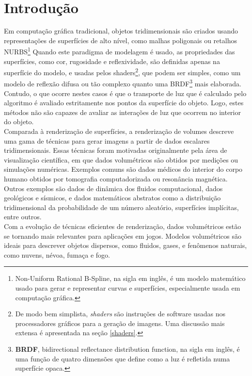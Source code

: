 \documentclass[12pt, a4paper, oneside]{book}
\begin{document}
%
%
%
\chapter{Introdução}	

Em computação gráfica tradicional, objetos tridimensionais são criados usando representações de superfícies de alto nível, como malhas poligonais ou retalhos NURBS\footnote{Non-Uniform Rational B-Spline, na sigla em inglês, é um modelo matemático usado para gerar e representar curvas e superfícies, especialmente usada em computação gráfica.} Quando este paradigma de modelagem é usado, as propriedades das superfícies, como cor, rugosidade e reflexividade, são definidas apenas na superfície do modelo, e usadas pelos shaders\footnote{De modo bem simplista, {\it shaders} são instruções de software usadas nos processadores gráficos para a geração de imagens. Uma discussão mais extensa é apresentada na seção \ref{shaders}.}, que podem ser simples, como um modelo de reflexão difusa ou tão complexo quanto uma BRDF\footnote{{\bf BRDF}, bidirectional reflectance distribution function, na sigla em inglês, é uma função de quatro dimensões que define como a luz é refletida numa superfície opaca.} mais elaborada. Contudo, o que ocorre nestes casos é que o transporte de luz que é calculado pelo algoritmo é avaliado estritamente nos pontos da superfície do objeto. Logo, estes métodos não são capazes de avaliar as interações de luz que ocorrem no interior do objeto. \\

Comparada à renderização de superfícies, a renderização de volumes descreve uma gama de técnicas para gerar imagens a partir de dados escalares tridimensionais. Essas técnicas foram motivadas originalmente pela área de visualização científica, em que dados volumétricos são obtidos por medições ou simulações numéricas. Exemplos comuns são dados médicos do interior do corpo humano obtidos por tomografia computadorizada ou resonância magnética. Outros exemplos são dados de dinâmica dos fluidos computacional, dados geológicos e sísmicos, e dados matemáticos abstratos como a distribuição tridimensional da probabilidade de um número aleatório, superfícies implícitas, entre outros. \\

Com a evolução de técnicas eficientes de renderização, dados volumétricos estão se tornando mais relevantes para aplicações em jogos. Modelos volumétricos são ideais para descrever objetos dispersos, como fluidos, gases, e fenômenos naturais, como nuvens, névoa, fumaça e fogo. \\
\end{document}

